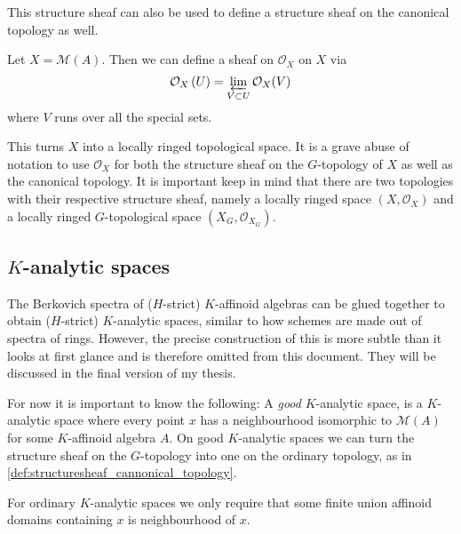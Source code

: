This structure sheaf can also be used to define a structure sheaf on the canonical topology as well. 
\begin{definition}\label{def:structuresheaf_cannonical_topology}
	Let $X = \mathcal{M} (A)$. Then we can define a sheaf on $\mathcal{O}_X$ on $X$ via \[
		\mathcal{O}_X\left( U \right)  = \varprojlim_{V \subset U} \mathcal{O}_X(V)
	\]   
	where $V$ runs over all the special sets.
\end{definition}
This turns $X$ into a locally ringed topological space. 
It is a grave abuse of notation to use $\mathcal{O}_X$ for both the structure sheaf on the $G$-topology of $X$ as well as the canonical topology. 
It is important keep in mind that there are two topologies with their respective structure sheaf, namely a locally ringed space $(X, \mathcal{O}_X)$ and a locally ringed $G$-topological space $(X_G, \mathcal{O}_{X_G})$. 


\subsection{$K$-analytic spaces} \label{sec:k_analytic_spaces}

The Berkovich spectra of ($H$-strict) $K$-affinoid algebras can be glued together to obtain ($H$-strict) $K$-analytic spaces, similar to how schemes are made out of spectra of rings. 
However, the precise construction of this is more subtle than it looks at first glance and is therefore omitted from this document. 
They will be discussed in the final version of my thesis. 

For now it is important to know the following:
A \emph{good} $K $-analytic space, is a $K$-analytic space where every point $x$ has a neighbourhood isomorphic to $\mathcal{M} (A)$ for some $K$-affinoid algebra $A$. 
On good  $K$-analytic spaces we can turn the structure sheaf on the $G$-topology into one on the ordinary topology, as in  \cref{def:structuresheaf_cannonical_topology}. 

For ordinary $K$-analytic spaces we only require that some finite union affinoid domains containing $x$ is neighbourhood of $x$. 



